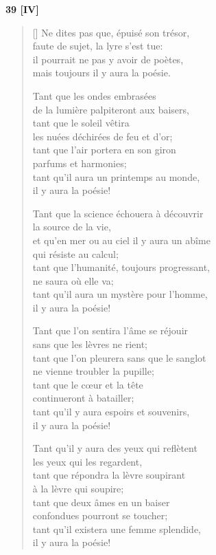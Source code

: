 \documentclass[a4paper,12pt]{book}
\begin{document}
\bigskip

\begin{center}
  \textbf{39 [IV]}
\end{center}

\settowidth{\versewidth}{tant qu'il existera une femme splendide,}

\begin{verse}[\versewidth]
  Ne dites pas que, épuisé son trésor, \\
  faute de sujet, la lyre s'est tue: \\
  il pourrait ne pas y avoir de poètes, \\
  mais toujours il y aura la poésie.

  Tant que les ondes embrasées \\
  de la lumière palpiteront aux baisers, \\
  tant que le soleil vêtira \\
  les nuées déchirées de feu et d'or; \\
  tant que l'air portera en son giron \\
  parfums et harmonies; \\
  tant qu'il aura un printemps au monde, \\
  il y aura la poésie!

  Tant que la science échouera à découvrir \\
  la source de la vie, \\
  et qu'en mer ou au ciel il y aura un abîme \\
  qui résiste au calcul; \\
  tant que l'humanité, toujours progressant, \\
  ne saura où elle va; \\
  tant qu'il aura un mystère pour l'homme, \\
  il y aura la poésie!

  Tant que l'on sentira l'âme se réjouir \\
  sans que les lèvres ne rient; \\
  tant que l'on pleurera sans que le sanglot \\
  ne vienne troubler la pupille; \\
  tant que le cœur et la tête \\
  continueront à batailler; \\
  tant qu'il y aura espoirs et souvenirs, \\
  il y aura la poésie!

  Tant qu'il y aura des yeux qui reflètent \\
  les yeux qui les regardent, \\
  tant que répondra la lèvre soupirant \\
  à la lèvre qui soupire; \\
  tant que deux âmes en un baiser \\
  confondues pourront se toucher; \\
  tant qu'il existera une femme splendide, \\
  il y aura la poésie!
\end{verse}
\end{document}
